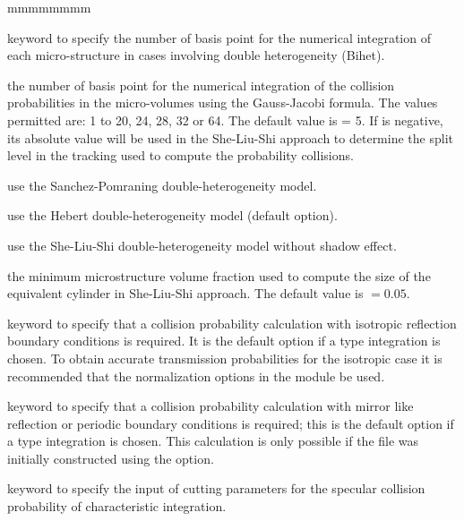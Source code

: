 \begin{ListeDeDescription}{mmmmmmmm}
\item[\moc{QUAB}] keyword to specify the number of basis point for the
numerical integration of each micro-structure in cases involving double
heterogeneity (Bihet).

\item[\dusa{iquab}] the number of basis point for the numerical integration of
the collision probabilities in the micro-volumes using the Gauss-Jacobi
formula. The values permitted are: 1 to 20, 24, 28, 32 or 64. The default value
is  = 5. If  is negative, its absolute value will be used in the She-Liu-Shi approach to determine the
split level in the tracking used to compute the probability collisions.

\item[\moc{SAPO}] use the Sanchez-Pomraning double-heterogeneity model.\cite{sapo}

\item[\moc{HEBE}] use the Hebert double-heterogeneity model (default option).\cite{BIHET}

\item[\moc{SLSI}] use the She-Liu-Shi double-heterogeneity model without shadow effect.\cite{She2017}

\item[\dusa{frtm}] the minimum microstructure volume fraction used to compute the size of the equivalent cylinder in She-Liu-Shi approach. The default value is  $=0.05$.

\item[\moc{PISO}] keyword to specify that a collision probability calculation with isotropic reflection boundary 
conditions is required. It is the default option if a  type integration is chosen. To obtain accurate
transmission probabilities for the isotropic case it is recommended that the normalization 
options in the  module be used. 

\item[\moc{PSPC}] keyword to specify that a collision probability calculation with mirror like reflection or periodic 
boundary conditions is required; this is the default option if a  type integration is chosen. 
This calculation is only possible if the file was initially constructed using the  option. 

\item[\moc{CUT}] keyword to specify the input of cutting parameters for the specular collision probability
of characteristic integration. 


\end{ListeDeDescription}
